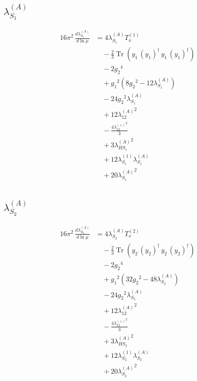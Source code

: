 \documentclass[10pt,a4paper]{article}
\begin{document}
\subsection*{$\lambda_{S_1}^{(A)}$}
\begin{align*}
16\pi^2\,\frac{d \lambda_{S_1}^{(A)}}{d\ln\mu} &=4 {\lambda_{S_1}^{(A)}} T_{\nu}^{(1)} \\
&\quad -\frac{2}{3} \operatorname{Tr}\!\left({y_1}\,\left({y_1}\right)^{\dagger}\,{y_1}\,\left({y_1}\right)^{\dagger}\right) \\
&\quad -2 {g_2}^4 \\
&\quad +{g_1}^2 \left(8 {g_2}^2-12 {\lambda_{S_1}^{(A)}}\right) \\
&\quad -24 {g_2}^2 {\lambda_{S_1}^{(A)}} \\
&\quad +12 {\lambda_{12}^{(A)}}^2 \\
&\quad -\frac{4 {\lambda_{12}^{(\times)}}^2}{3} \\
&\quad +3 {\lambda_{HS_1}^{(A)}}^2 \\
&\quad +12 {\lambda_{S_1}^{(1)}} {\lambda_{S_1}^{(A)}} \\
&\quad +20 {\lambda_{S_1}^{(A)}}^2 \\
\end{align*}
\subsection*{$\lambda_{S_2}^{(A)}$}
\begin{align*}
16\pi^2\,\frac{d \lambda_{S_2}^{(A)}}{d\ln\mu} &=4 {\lambda_{S_2}^{(A)}} T_{\nu}^{(2)} \\
&\quad -\frac{2}{3} \operatorname{Tr}\!\left({y_2}\,\left({y_2}\right)^{\dagger}\,{y_2}\,\left({y_2}\right)^{\dagger}\right) \\
&\quad -2 {g_2}^4 \\
&\quad +{g_1}^2 \left(32 {g_2}^2-48 {\lambda_{S_2}^{(A)}}\right) \\
&\quad -24 {g_2}^2 {\lambda_{S_2}^{(A)}} \\
&\quad +12 {\lambda_{12}^{(A)}}^2 \\
&\quad -\frac{4 {\lambda_{12}^{(\times)}}^2}{3} \\
&\quad +3 {\lambda_{HS_2}^{(A)}}^2 \\
&\quad +12 {\lambda_{S_2}^{(1)}} {\lambda_{S_2}^{(A)}} \\
&\quad +20 {\lambda_{S_2}^{(A)}}^2 \\
\end{align*}
\end{document}
